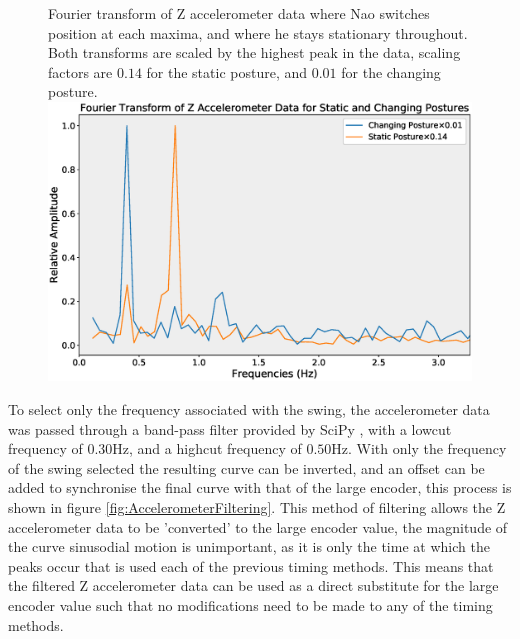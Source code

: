 \documentclass[11pt]{article}
\begin{document}
    \begin{figure}[!htb]
        \centering
        \captionbox
             {Fourier transform of Z accelerometer data where Nao switches position at each maxima, and where he stays stationary throughout. Both transforms are scaled by the highest peak in the data, scaling factors are $0.14$ for the static posture, and $0.01$ for the changing posture.\label{fig:FrequencyDecomposition}}
             {\includegraphics[width=1.0\textwidth]{FrequencyDecomposition.eps}}
    \end{figure}

To select only the frequency associated with the swing, the accelerometer data was passed through a band-pass filter provided by SciPy \cite{SciPy}, with a lowcut frequency of $0.30$Hz, and a highcut frequency of $0.50$Hz. With only the frequency of the swing selected the resulting curve can be inverted, and an offset can be added to synchronise the final curve with that of the large encoder, this process is shown in figure \ref{fig:AccelerometerFiltering}. This method of filtering allows the Z accelerometer data to be 'converted' to the large encoder value, the magnitude of the curve sinusodial motion is unimportant, as it is only the time at which the peaks occur that is used each of the previous timing methods. This means that the filtered Z accelerometer data can be used as a direct substitute for the large encoder value such that no modifications need to be made to any of the timing methods.\\
\end{document}
